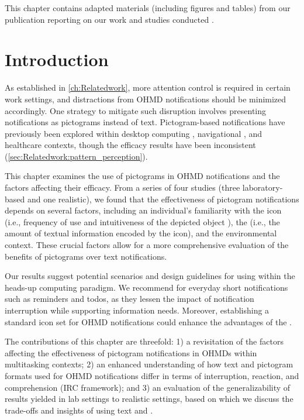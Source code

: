 This chapter contains adapted materials (including figures and tables) from our publication reporting on our work and studies conducted \cite{janaka_can_2023}.







\section{Introduction}
\label{sec:Iconnotif:introduction}

As established in \autoref{ch:Relatedwork}, more attention control is required in certain work settings, and distractions from OHMD notifications should be minimized accordingly. One strategy to mitigate such disruption involves presenting notifications as pictograms instead of text. Pictogram-based notifications have previously been explored within desktop computing \cite{warnock_multiple_2013, warnock_subjective_2011, somervell_evaluating_2002}, navigational \cite{ells_rapid_1979, camacho_icons_1990, houts_role_2006}, and healthcare \cite{houts_role_2006, leos_toro_perceptions_2019} contexts, though the efficacy results have been inconsistent (\autoref{sec:Relatedwork:pattern_perception}).

This chapter examines the use of pictograms in OHMD notifications and the factors affecting their efficacy. From a series of four studies (three laboratory-based and one realistic), we found that the effectiveness of pictogram notifications depends on several factors, including an individual's familiarity with the icon (i.e., frequency of use and intuitiveness of the depicted object \cite{isherwood_icon_2007}), the \encodingcomplexity{} (i.e., the amount of textual information encoded by the icon), and the environmental context. These crucial factors allow for a more comprehensive evaluation of the benefits of pictograms over text notifications.

Our results suggest potential scenarios and design guidelines for using  within the heads-up computing paradigm. We recommend  for everyday short notifications such as reminders and todos, as they lessen the impact of notification interruption while supporting information needs. Moreover, establishing a standard icon set for OHMD notifications could enhance the advantages of the \iconformat{}.

The contributions of this chapter are threefold: 1) a revisitation of the factors affecting the effectiveness of pictogram notifications in OHMDs within multitasking contexts; 2) an enhanced understanding of how text and pictogram formats used for OHMD notifications differ in terms of interruption, reaction, and comprehension (IRC framework); and 3) an evaluation of the generalizability of results yielded in lab settings to realistic settings, based on which we discuss the trade-offs and insights of using text and .











